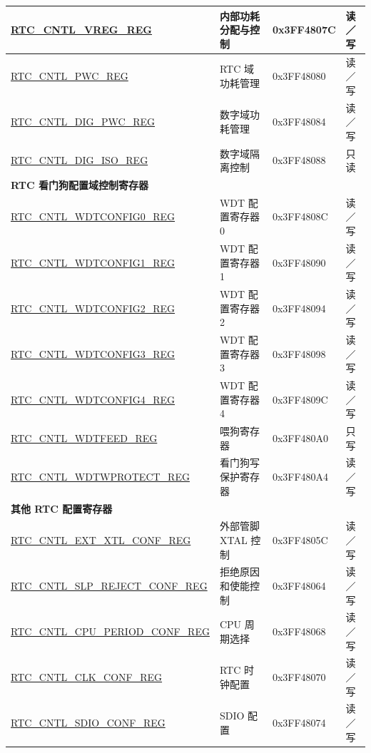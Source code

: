 \begin{longtable}{ | p{6.5cm} | p{5cm} | p{2cm} | p{2cm} | }
\hyperref[regdesc:RTCCNTLVREGREG]{RTC\_CNTL\_VREG\_REG} & 内部功耗分配与控制 & 0x3FF4807C & 读／写 \\ \hline
\hyperref[regdesc:RTCCNTLPWCREG]{RTC\_CNTL\_PWC\_REG} & RTC 域功耗管理 & 0x3FF48080 & 读／写 \\ \hline
\hyperref[regdesc:RTCCNTLDIGPWCREG]{RTC\_CNTL\_DIG\_PWC\_REG} & 数字域功耗管理 & 0x3FF48084 & 读／写 \\ \hline
\hyperref[regdesc:RTCCNTLDIGISOREG]{RTC\_CNTL\_DIG\_ISO\_REG} & 数字域隔离控制 & 0x3FF48088 & 只读\\ \hline
\multicolumn{4}{|l|}{\textbf{RTC 看门狗配置域控制寄存器}} \\ \hline
\hyperref[regdesc:RTCCNTLWDTCONFIG0REG]{RTC\_CNTL\_WDTCONFIG0\_REG} & WDT 配置寄存器 0 & 0x3FF4808C & 读／写 \\ \hline
\hyperref[regdesc:RTCCNTLWDTCONFIGnREG]{RTC\_CNTL\_WDTCONFIG1\_REG} & WDT 配置寄存器 1 & 0x3FF48090 & 读／写 \\ \hline
\hyperref[regdesc:RTCCNTLWDTCONFIGnREG]{RTC\_CNTL\_WDTCONFIG2\_REG} & WDT 配置寄存器 2 & 0x3FF48094 & 读／写 \\ \hline
\hyperref[regdesc:RTCCNTLWDTCONFIGnREG]{RTC\_CNTL\_WDTCONFIG3\_REG} & WDT 配置寄存器 3 & 0x3FF48098 & 读／写 \\ \hline
\hyperref[regdesc:RTCCNTLWDTCONFIGnREG]{RTC\_CNTL\_WDTCONFIG4\_REG} & WDT 配置寄存器 4 & 0x3FF4809C & 读／写 \\ \hline
\hyperref[regdesc:RTCCNTLWDTFEEDREG]{RTC\_CNTL\_WDTFEED\_REG} & 喂狗寄存器 & 0x3FF480A0 & 只写 \\ \hline
\hyperref[regdesc:RTCCNTLWDTWPROTECTREG]{RTC\_CNTL\_WDTWPROTECT\_REG} & 看门狗写保护寄存器 & 0x3FF480A4 & 读／写 \\ \hline
\multicolumn{4}{|l|}{\textbf{其他 RTC 配置寄存器}} \\ \hline
\hyperref[regdesc:RTCCNTLEXTXTLCONFREG]{RTC\_CNTL\_EXT\_XTL\_CONF\_REG} & 外部管脚 XTAL 控制 & 0x3FF4805C & 读／写 \\ \hline
\hyperref[regdesc:RTCCNTLSLPREJECTCONFREG]{RTC\_CNTL\_SLP\_REJECT\_CONF\_REG} & 拒绝原因和使能控制 & 0x3FF48064 & 读／写 \\ \hline
\hyperref[regdesc:RTCCNTLCPUPERIODCONFREG]{RTC\_CNTL\_CPU\_PERIOD\_CONF\_REG} & CPU 周期选择 & 0x3FF48068 & 读／写 \\ \hline
\hyperref[regdesc:RTCCNTLCLKCONFREG]{RTC\_CNTL\_CLK\_CONF\_REG} & RTC 时钟配置 & 0x3FF48070 & 读／写 \\ \hline
\hyperref[regdesc:RTCCNTLSDIOCONFREG]{RTC\_CNTL\_SDIO\_CONF\_REG} & SDIO 配置 & 0x3FF48074 & 读／写 \\ \hline

\end{longtable}
